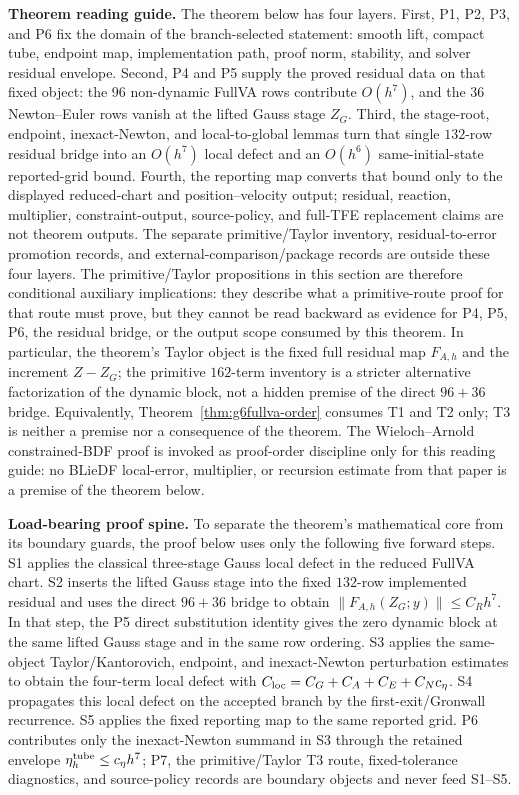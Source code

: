 \documentclass[preprint,12pt]{elsarticle}
\newcommand{\tfe}{TFE}
\begin{document}
\noindent\textbf{Theorem reading guide.}
The theorem below has four layers.  First, P1, P2, P3, and P6 fix the
domain of the branch-selected statement: smooth lift, compact tube, endpoint
map, implementation path, proof norm, stability, and solver residual
envelope.  Second, P4 and P5 supply the proved residual data on that fixed
object: the 96 non-dynamic FullVA rows contribute \(O(h^7)\), and the 36
Newton--Euler rows vanish at the lifted Gauss stage \(Z_G\).  Third, the
stage-root, endpoint, inexact-Newton, and local-to-global lemmas turn that
single \(132\)-row residual bridge into an \(O(h^7)\) local defect and an
\(O(h^6)\) same-initial-state reported-grid bound.  Fourth, the reporting
map converts that bound only to the displayed reduced-chart and
position--velocity output; residual, reaction, multiplier, constraint-output,
source-policy, and full-\tfe{} replacement claims are not theorem outputs.  The separate
primitive/Taylor inventory, residual-to-error promotion records, and
external-comparison/package records are outside these four layers.  The
primitive/Taylor propositions in this section are therefore conditional
auxiliary implications: they describe what a primitive-route proof for that
route must prove, but they cannot be read backward as evidence for P4, P5, P6, the
residual bridge, or the output scope consumed by this theorem.
In particular, the theorem's Taylor object is the fixed full residual map
\(F_{A,h}\) and the increment \(Z-Z_G\); the primitive \(162\)-term inventory is
a stricter alternative factorization of the dynamic block, not a hidden
premise of the direct \(96+36\) bridge.
Equivalently, Theorem~\ref{thm:g6fullva-order} consumes T1 and T2 only; T3 is
neither a premise nor a consequence of the theorem.
The Wieloch--Arnold constrained-BDF proof is invoked as proof-order discipline only for
this reading guide: no BLieDF local-error, multiplier, or recursion estimate
from that paper is a premise of the theorem below.

\noindent\textbf{Load-bearing proof spine.}
To separate the theorem's mathematical core from its boundary guards, the
proof below uses only the following five forward steps.  S1 applies the
classical three-stage Gauss local defect in the reduced FullVA chart.  S2
inserts the lifted Gauss stage into the fixed \(132\)-row implemented residual
and uses the direct \(96+36\) bridge to obtain
\(\|F_{A,h}(Z_G;y)\|\le C_Rh^7\).  In that step, the P5 direct substitution
identity gives the zero dynamic block at the same lifted Gauss stage and in
the same row ordering.  S3 applies the same-object
Taylor/Kantorovich, endpoint, and inexact-Newton perturbation estimates to
obtain the four-term local defect with
\(C_{\rm loc}=C_G+C_A+C_E+C_Nc_\eta\).  S4 propagates this local defect on
the accepted branch by the first-exit/Gronwall recurrence.  S5 applies the
fixed reporting map to the same reported grid.  P6 contributes only the
inexact-Newton summand in S3 through the retained envelope
\(\eta_h^{\rm tube}\le c_\eta h^7\); P7, the primitive/Taylor T3 route,
fixed-tolerance diagnostics, and source-policy records are boundary objects
and never feed S1--S5.
\end{document}

